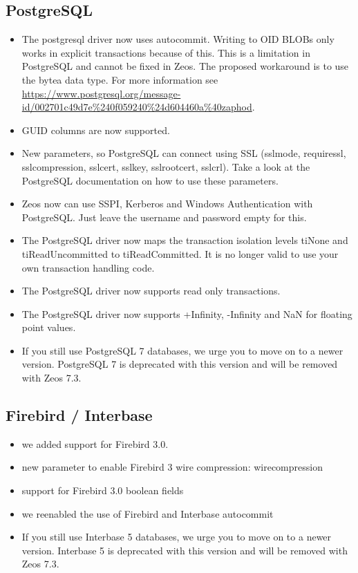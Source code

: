 \documentclass[a4paper,12pt,oneside]{article}
\begin{document}
\subsection{PostgreSQL}
\begin{itemize}
\item 
  The postgresql driver now uses autocommit.
	Writing to OID BLOBs only works in explicit transactions because of this. 
  This is a limitation in PostgreSQL and cannot be fixed in Zeos.
	The proposed workaround is to use the bytea data type.
	For more information see \url{https://www.postgresql.org/message-id/002701c49d7e%240f059240%24d604460a%40zaphod}.
\item GUID columns are now supported.
\item 
  New parameters, so PostgreSQL can connect using SSL (sslmode, requiressl, sslcompression, sslcert, sslkey, sslrootcert, sslcrl). 
	Take a look at the PostgreSQL documentation on how to use these parameters.
\item
  Zeos now can use SSPI, Kerberos and Windows Authentication with PostgreSQL.
	Just leave the username and password empty for this.
\item
  The PostgreSQL driver now maps the transaction isolation levels tiNone and tiReadUncommitted to tiReadCommitted.
	It is no longer valid to use your own transaction handling code.
\item
  The PostgreSQL driver now supports read only transactions.
\item
  The PostgreSQL driver now supports +Infinity, -Infinity and NaN for floating point values.
\item
  If you still use PostgreSQL 7 databases, we urge you to move on to a newer version.
	PostgreSQL 7 is deprecated with this version and will be removed with Zeos 7.3.
\end{itemize}

\subsection{Firebird / Interbase}
\begin{itemize}
\item we added support for Firebird 3.0.
\item new parameter to enable Firebird 3 wire compression: wirecompression
\item support for Firebird 3.0 boolean fields
\item we reenabled the use of Firebird and Interbase autocommit
\item 
  If you still use Interbase 5 databases, we urge you to move on to a newer version.
	Interbase 5 is deprecated with this version and will be removed with Zeos 7.3.
\end{itemize}
\end{document}
